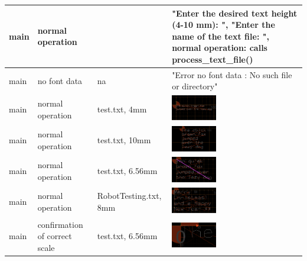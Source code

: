 \begin{longtable}{|>{\raggedright\arraybackslash}m{}|>{\raggedright\arraybackslash}m{}|>{\raggedright\arraybackslash}m{}|>{\raggedright\arraybackslash}m{}|}
        main & normal operation & 4mm &  "Enter the desired text height (4-10 mm): ", "Enter the name of the text file: ", normal operation: calls process\_text\_file()\\ \hline
        main & no font data & na & "Error no font data : No such file or directory"\\ \hline
        main & normal operation & test.txt, 4mm & \includegraphics[width=0.35\textwidth]{src/Screenshot 2024-12-11 at 21.19.08.png}\\ \hline
        main & normal operation & test.txt, 10mm & \includegraphics[width=0.35\textwidth]{src/Screenshot 2024-12-11 at 21.27.58.png}\\ \hline
        main & normal operation & test.txt, 6.56mm & \includegraphics[width=0.35\textwidth]{src/Screenshot 2024-12-11 at 21.55.33.png}\\ \hline
        main & normal operation & RobotTesting.txt, 8mm & \includegraphics[width=0.35\textwidth]{src/Screenshot 2024-12-11 at 22.53.43.png}\\ \hline
        main & confirmation of correct scale & test.txt, 6.56mm & \includegraphics[width=0.35\textwidth]{src/Screenshot 2024-12-11 at 21.58.13.png}\\ \hline

\end{longtable}

